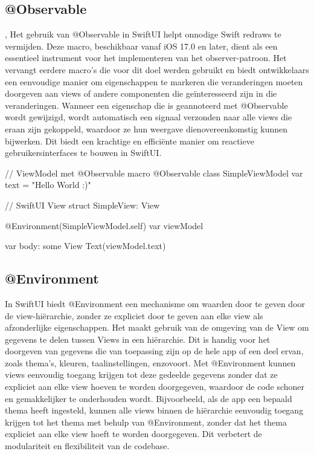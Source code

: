 \subsection{@Observable}
\autocite{AppleObservable}, \autocite{ObservablePerformance} Het gebruik van @Observable in SwiftUI helpt onnodige Swift redraws te vermijden. Deze macro, beschikbaar vanaf iOS 17.0 en later, dient als een essentieel instrument voor het implementeren van het observer-patroon. Het vervangt eerdere macro's die voor dit doel werden gebruikt en biedt ontwikkelaars een eenvoudige manier om eigenschappen te markeren die veranderingen moeten doorgeven aan views of andere componenten die geïnteresseerd zijn in die veranderingen. Wanneer een eigenschap die is geannoteerd met @Observable wordt gewijzigd, wordt automatisch een signaal verzonden naar alle views die eraan zijn gekoppeld, waardoor ze hun weergave dienovereenkomstig kunnen bijwerken. Dit biedt een krachtige en efficiënte manier om reactieve gebruikersinterfaces te bouwen in SwiftUI.

\begin{swift}[caption=Example of Observable, label=Observable_example]
// ViewModel met @Observable macro
@Observable class SimpleViewModel {
    var text = "Hello World :)"
}

// SwiftUI View
struct SimpleView: View {
    @Environment(SimpleViewModel.self) var viewModel
    
    var body: some View {
        Text(viewModel.text)
    }
}
\end{swift}


\subsection{@Environment}
\autocite{AppleEnvironment} In SwiftUI biedt @Environment een mechanisme om waarden door te geven door de view-hiërarchie, zonder ze expliciet door te geven aan elke view als afzonderlijke eigenschappen. Het maakt gebruik van de omgeving van de View om gegevens te delen tussen Views in een hiërarchie. Dit is handig voor het doorgeven van gegevens die van toepassing zijn op de hele app of een deel ervan, zoals thema's, kleuren, taalinstellingen, enzovoort. Met @Environment kunnen views eenvoudig toegang krijgen tot deze gedeelde gegevens zonder dat ze expliciet aan elke view hoeven te worden doorgegeven, waardoor de code schoner en gemakkelijker te onderhouden wordt. Bijvoorbeeld, als de app een bepaald thema heeft ingesteld, kunnen alle views binnen de hiërarchie eenvoudig toegang krijgen tot het thema met behulp van @Environment, zonder dat het thema expliciet aan elke view hoeft te worden doorgegeven. Dit verbetert de modulariteit en flexibiliteit van de codebase.


